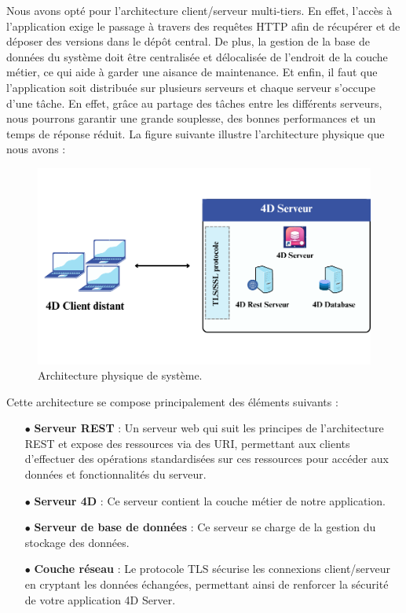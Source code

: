 Nous avons opté pour l’architecture client/serveur multi-tiers. En effet, l’accès à l’application exige le passage à
travers des requêtes HTTP afin de récupérer et de déposer des versions dans le dépôt
central. De plus, la gestion de la base de données du système doit être centralisée et délocalisée de l’endroit de la couche métier, ce qui aide à garder une aisance de maintenance.
Et enfin, il faut que l’application soit distribuée sur plusieurs serveurs et chaque serveur
s’occupe d’une tâche. En effet, grâce au partage des tâches entre les différents serveurs,
nous pourrons garantir une grande souplesse, des bonnes performances et un temps de
réponse réduit. La figure suivante illustre l’architecture physique que nous avons :

\begin{figure}[H]
    \centering
    \includegraphics[width=15cm]{Figures/architecturePhysique.png}
    \caption{Architecture physique de système.}
\end{figure}

Cette architecture se compose principalement des éléments suivants :

\begin{itemize}
    \item[$\bullet$] \textbf{Serveur REST} : Un serveur web qui suit les principes de l'architecture REST et expose des ressources via des URI, permettant aux clients d'effectuer des opérations standardisées sur ces ressources pour accéder aux données et fonctionnalités du serveur.
    \item[$\bullet$] \textbf{Serveur 4D} : Ce serveur contient la couche métier de notre application.
    \item[$\bullet$] \textbf{Serveur de base de données} : Ce serveur se charge de la gestion du stockage des données.
    \item[$\bullet$] \textbf{Couche réseau} : Le protocole TLS sécurise les connexions client/serveur en cryptant les données échangées, permettant ainsi de renforcer la sécurité de votre application 4D Server.
\end{itemize}

